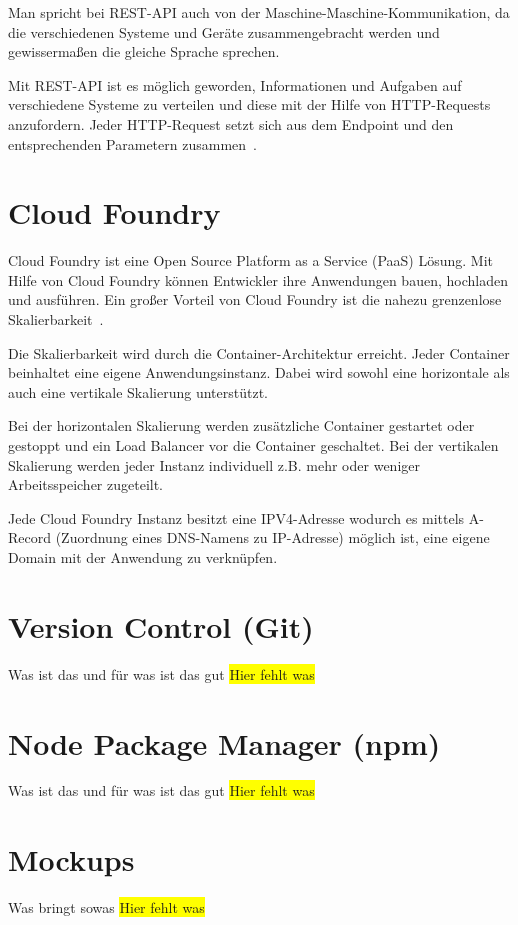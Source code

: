 Man spricht bei REST-API auch von der Maschine-Maschine-Kommunikation, da die verschiedenen Systeme und Geräte
zusammengebracht werden und gewissermaßen die gleiche Sprache sprechen.

Mit REST-API ist es möglich geworden, Informationen und Aufgaben auf verschiedene Systeme zu verteilen und diese mit der
Hilfe von HTTP-Requests anzufordern. Jeder HTTP-Request setzt sich aus dem Endpoint und den entsprechenden Parametern
zusammen~\cite{online_grundlagen_rest}.

\section{Cloud Foundry}
Cloud Foundry ist eine Open Source Platform as a Service (PaaS) Lösung. Mit Hilfe von Cloud Foundry können Entwickler
ihre Anwendungen bauen, hochladen und ausführen. Ein großer Vorteil von Cloud Foundry ist die nahezu grenzenlose
Skalierbarkeit~\cite{online_grundlagen_cf}.

Die Skalierbarkeit wird durch die Container-Architektur erreicht. Jeder Container beinhaltet eine eigene Anwendungsinstanz.
Dabei wird sowohl eine horizontale als auch eine vertikale Skalierung unterstützt.

Bei der horizontalen Skalierung werden zusätzliche Container gestartet oder gestoppt und ein Load Balancer vor die
Container geschaltet. Bei der vertikalen Skalierung werden jeder Instanz individuell z.B. mehr oder weniger Arbeitsspeicher
zugeteilt.

Jede Cloud Foundry Instanz besitzt eine IPV4-Adresse wodurch es mittels A-Record (Zuordnung eines DNS-Namens zu IP-Adresse)
möglich ist, eine eigene Domain mit der Anwendung zu verknüpfen.

\section{Version Control (Git)}
Was ist das und für was ist das gut
\colorbox{yellow}{Hier fehlt was}

\section{Node Package Manager (npm)}
Was ist das und für was ist das gut
\colorbox{yellow}{Hier fehlt was}

\section{Mockups}
Was bringt sowas
\colorbox{yellow}{Hier fehlt was}

